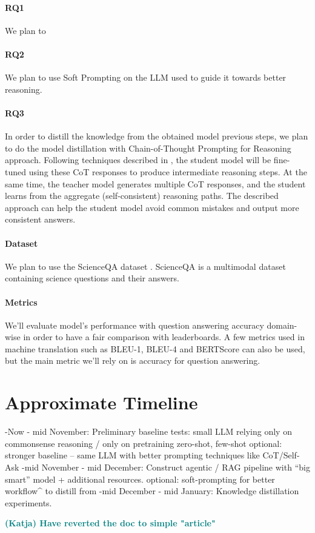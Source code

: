 \documentclass[10pt]{article}
\newcommand{\katja}[1]{\textbf{\textcolor{teal}{(Katja) #1}}}
\begin{document}
\paragraph{RQ1} 
We plan to 

\paragraph{RQ2}
We plan to use Soft Prompting on the LLM used to guide it towards better reasoning. 

\paragraph{RQ3}
In order to distill the knowledge from the obtained model previous steps, we plan to do the model distillation with Chain-of-Thought Prompting for Reasoning approach. Following techniques described in \cite{magister2022teaching} \cite{wei2022chain}, the student model will be fine-tuned using these CoT responses to produce intermediate reasoning steps. At the same time, the teacher model generates multiple CoT responses, and the student learns from the aggregate (self-consistent) reasoning paths. The described approach can help the student model avoid common mistakes and output more consistent answers.

\paragraph{Dataset}
We plan to use the ScienceQA dataset \cite{lu2022learn}. ScienceQA is a multimodal dataset containing science questions and their answers.

\paragraph{Metrics}
We'll evaluate model's performance with question answering accuracy domain-wise in order to have a fair comparison with leaderboards. A few metrics used in machine translation such as BLEU-1, BLEU-4 and BERTScore can also be used, but the main metric we'll rely on is accuracy for question answering.

\section{Approximate Timeline}
-Now - mid November: 
  Preliminary baseline tests: small LLM relying only on commonsense reasoning / only on pretraining 
  zero-shot, few-shot
  optional: stronger baseline – same LLM with better prompting techniques like CoT/Self-Ask
-mid November - mid December:
  Construct agentic / RAG pipeline with “big smart” model + additional resources.
  optional: soft-prompting for better workflow^ to distill from
-mid December - mid January:
  Knowledge distillation experiments.


\katja{Have reverted the doc to simple "article"}



\end{document}
